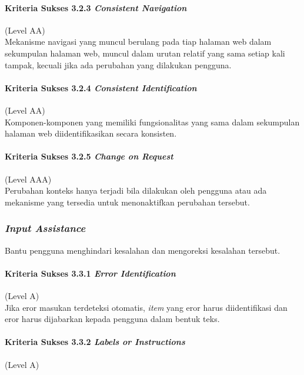 \paragraph{Kriteria Sukses 3.2.3 \textit{Consistent Navigation}}
\label{sec:kriteria_sukses_3.2.3}
(Level AA)\\

Mekanisme navigasi yang muncul berulang pada tiap halaman web dalam sekumpulan halaman web, muncul dalam urutan relatif yang sama setiap kali tampak, kecuali jika ada perubahan yang dilakukan pengguna.

\paragraph{Kriteria Sukses 3.2.4 \textit{Consistent Identification}}
\label{sec:kriteria_sukses_3.2.4}
(Level AA)\\

Komponen-komponen yang memiliki fungsionalitas yang sama dalam sekumpulan halaman web diidentifikasikan secara konsisten.

\paragraph{Kriteria Sukses 3.2.5 \textit{Change on Request}}
\label{sec:kriteria_sukses_3.2.5}
(Level AAA)\\

Perubahan konteks hanya terjadi bila dilakukan oleh pengguna atau ada mekanisme yang tersedia untuk menonaktifkan perubahan tersebut.

\subsubsection{\textit{Input Assistance}}
\label{sec:input_assistance}
Bantu pengguna menghindari kesalahan dan mengoreksi kesalahan tersebut.

\paragraph{Kriteria Sukses 3.3.1 \textit{Error Identification}}
\label{sec:kriteria_sukses_3.3.1}
(Level A)\\

Jika eror masukan terdeteksi otomatis, \textit{item} yang eror harus diidentifikasi dan eror harus dijabarkan kepada pengguna dalam bentuk teks.

\paragraph{Kriteria Sukses 3.3.2 \textit{Labels or Instructions}}
\label{sec:kriteria_sukses_3.3.2}
(Level A)\\

